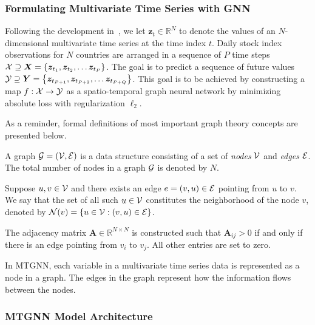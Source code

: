 \subsubsection{Formulating Multivariate Time Series with GNN}
%
Following the development in~\cite{wu2020connecting}, we let $\bm{z}_t \in \mathbb{R}^N$ to denote the 
values of an $N$-dimensional multivariate time series at the time index $t$. Daily stock index observations
for $N$ countries are arranged in a sequence of $P$ time steps $\mathcal{X} \supseteq \bm{X} = 
\left\{\bm{z}_{t_1}, \bm{z}_{t_2}, \ldots \bm{z}_{t_P}\right\}$. The goal is to predict a sequence of
future values $\mathcal{Y} \supseteq \bm{Y} = \left\{\bm{z}_{t_{P+1}}, \bm{z}_{t_{P+2}}, \ldots \bm{z}_{t_{P+Q}}\right\}$. 
This goal is to be achieved by constructing a map $f: \mathcal{X} \rightarrow \mathcal{Y}$ as a spatio-temporal 
graph neural network by minimizing absolute loss with regularization $\ell_2$.

As a reminder, formal definitions of most important graph theory concepts are presented below.

\begin{defn}[Graph]
   A graph $\mathcal{G} = (\mathcal{V}, \mathcal{E})$ is a data structure consisting of a set of \textit{nodes} $\mathcal{V}$ 
   and \textit{edges} $\mathcal{E}$. The total number of nodes in a graph $\mathcal{G}$ is denoted by $N$.
\end{defn}

\begin{defn}[Neighborhood]
   Suppose $u, v \in \mathcal{V}$ and there exists an edge $e = (v, u) \in \mathcal{E}$ pointing from $u$ to $v$. 
   We say that the set of all such $u \in \mathcal{V}$ constitutes the neighborhood of the node $v$, denoted by $\mathcal{N}(v) = \{ u \in \mathcal{V}: (v, u) \in \mathcal{E}\}$.
\end{defn}

\begin{defn}
    The adjacency matrix $\bm{A} \in \mathbb{R}^{N \times N}$ is constructed such that $\bm{A}_{ij} > 0$ if 
    and only if there is an edge pointing from $v_i$ to $v_j$. All other entries are set to zero.
\end{defn}

In MTGNN, each variable in a multivariate time series data is represented as 
a node in a graph. The edges in the graph represent how the information flows between the nodes.

\subsubsection{MTGNN Model Architecture}

